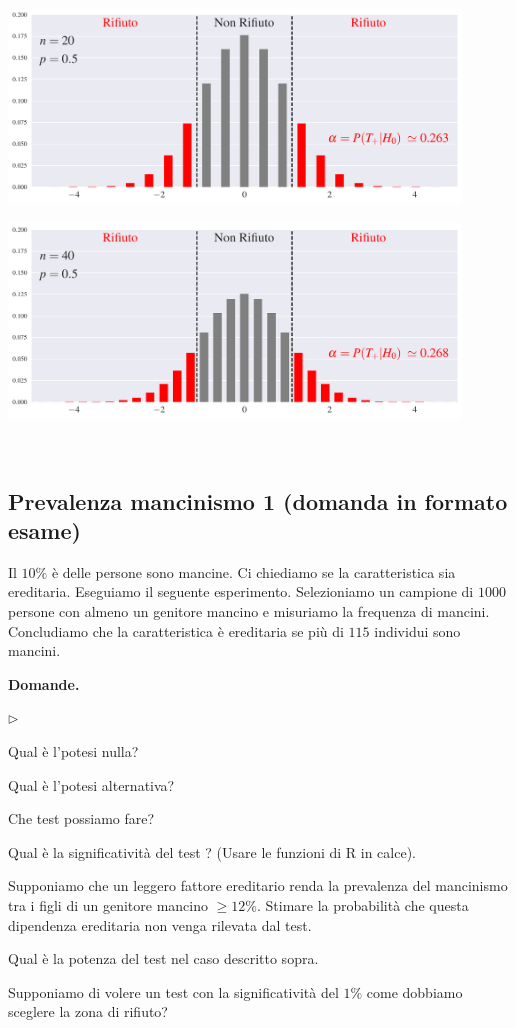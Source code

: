 \documentclass[12pt,openany]{book}
\newcommand{\mylabel}[1]{{\footnotesize\textsf{#1}}\hfill}
\renewenvironment{itemize}
  {\begin{list}{$\triangleright$}{%
   \setlength{\parskip}{0mm}
   \setlength{\topsep}{.2\baselineskip}
   \setlength{\rightmargin}{0mm}
   \setlength{\listparindent}{0mm}
   \setlength{\itemindent}{0mm}
   \setlength{\labelwidth}{3ex}
   \setlength{\itemsep}{.4\baselineskip}
   \setlength{\parsep}{0mm}
   \setlength{\partopsep}{0mm}
   \setlength{\labelsep}{1ex}
   \setlength{\leftmargin}{\labelwidth+\labelsep}
   \let\makelabel\mylabel}}{%
   \end{list}\vspace*{-1.3mm}}
\theoremstyle{mio}
\theoremstyle{liscio}
\begin{document}
\hfil\includegraphics[width=0.9\textwidth]{figure/B-test-standard2_01.pdf}

\hfil\includegraphics[width=0.9\textwidth]{figure/B-test-standard2_02.pdf}



\hfill{}\clearpage\
\subsection{Prevalenza mancinismo 1 (domanda in formato esame)}

Il $10\%$ è delle persone sono mancine. Ci chiediamo se la caratteristica sia ereditaria. Eseguiamo il seguente esperimento. Selezioniamo un campione di $1000$ persone con almeno un genitore mancino e misuriamo la frequenza di mancini. Concludiamo che la caratteristica \`e ereditaria se pi\`u di $115$ individui sono mancini.

\textbf{Domande.}

\begin{itemize}
\item[1.] Qual è l'potesi nulla?

\item[2.] Qual è l'potesi alternativa?

\item[3.] Che test possiamo fare?

\item[4.] Qual è la significatività del test ? (Usare le funzioni di R in calce).

\item[5.] Supponiamo che un leggero fattore ereditario renda la prevalenza del mancinismo tra i figli di un genitore mancino $\ge12\%$. Stimare la probabilità che questa dipendenza ereditaria non venga rilevata dal test. 

\item[6.] Qual è la potenza del test nel caso descritto sopra.

\item[7.] Supponiamo di volere un test con la significatività del $1\%$ come dobbiamo sceglere la zona di rifiuto?
\end{itemize}
\end{document}
